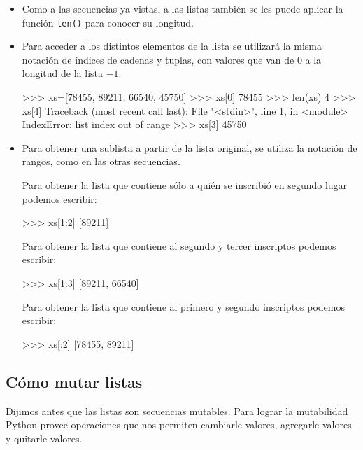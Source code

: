 \begin{itemize}

\item Como a las secuencias ya vistas, a las listas también se les puede
aplicar la función \lstinline+len()+ para conocer su longitud.

\item Para acceder a los distintos elementos de la lista se utilizará la
misma notación de índices de cadenas y tuplas, con valores que van de $0$ a la
longitud de la lista $-1$.

\begin{codigo-python-sn}
>>> xs=[78455, 89211, 66540, 45750]
>>> xs[0]
78455
>>> len(xs)
4
>>> xs[4]
Traceback (most recent call last):
  File "<stdin>", line 1, in <module>
IndexError: list index out of range
>>> xs[3]
45750
\end{codigo-python-sn}

\item Para obtener una sublista a partir de la lista original, se utiliza
la notación de rangos, como en las otras secuencias.

Para obtener la lista que contiene sólo a quién se inscribió en segundo
lugar podemos escribir:

\begin{codigo-python-sn}
>>> xs[1:2]
[89211]
\end{codigo-python-sn}

Para obtener la lista que contiene al segundo y tercer inscriptos
podemos escribir:

\begin{codigo-python-sn}
>>> xs[1:3]
[89211, 66540]
\end{codigo-python-sn}

Para obtener la lista que contiene al primero y segundo inscriptos
podemos escribir:

\begin{codigo-python-sn}
>>> xs[:2]
[78455, 89211]
\end{codigo-python-sn}

\end{itemize}

\subsection{Cómo mutar listas}

Dijimos antes que las listas son secuencias mutables. Para lograr la
mutabilidad Python provee operaciones que nos permiten cambiarle valores,
agregarle valores y quitarle valores.

